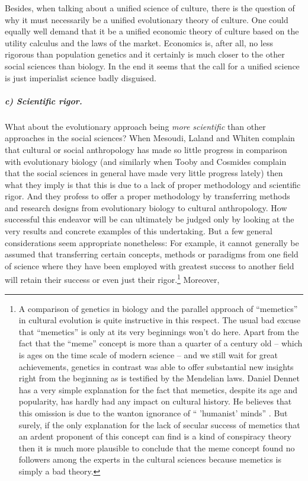 Besides, when talking about a unified science of culture, there is the
question of why it must necessarily be a unified evolutionary theory of
culture. One could equally well demand that it be a unified economic theory
of culture based on the utility calculus and the laws of the market.
Economics is, after all, no less rigorous than population genetics and it
certainly is much closer to the other social sciences than biology. In the end
it seems that the call for a unified science is just imperialist science badly
disguised.

\subparagraph{c) Scientific rigor.}

What about the evolutionary approach being {\em more scientific} than other
approaches in the social sciences? When Mesoudi, Laland and Whiten complain
that cultural or social anthropology has made so little progress in comparison
with evolutionary biology (and similarly when Tooby and Cosmides complain that
the social sciences in general have made very little progress lately) then
what they imply is that this is due to a lack of proper methodology and
scientific rigor. And they profess to offer a proper methodology by
transferring methods and research designs from evolutionary biology to
cultural anthropology. How successful this endeavor will be can ultimately
be judged only by looking at the very results and concrete examples of this
undertaking. But a few general considerations seem appropriate nonetheless: For
example, it cannot generally be assumed that transferring certain concepts,
methods or paradigms from one field of science where they have been employed
with greatest success to another field will retain their success or even just
their rigor.\footnote{A comparison of genetics in biology and the parallel
  approach of ``memetics'' in cultural evolution is quite instructive in this
  respect. The usual bad excuse that ``memetics'' is only at its very
  beginnings won't do here.  Apart from the fact that the ``meme'' concept is
  more than a quarter of a century old -- which is ages on the time scale of
  modern science -- and we still wait for great achievements, genetics in
  contrast was able to offer substantial new insights right from the beginning
  as is testified by the Mendelian laws. Daniel Dennet has a very simple
  explanation for the fact that memetics, despite its age and popularity, has
  hardly had any impact on cultural history. He believes that this omission is
  due to the wanton ignorance of `` 'humanist' minds'' \cite[p.\ 
  361]{dennett:1996}. But surely, if the only explanation for the lack of
  secular success of memetics that an ardent proponent of this concept can
  find is a kind of conspiracy theory then it is much more plausible to
  conclude that the meme concept found no followers among the experts in the
  cultural sciences because memetics is simply a bad theory.}  Moreover,
